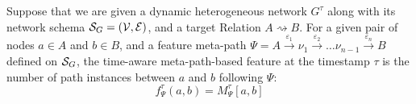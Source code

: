 \begin{definition}
	Suppose that we are given a dynamic heterogeneous network $G^{\tau}$ along with its network schema $\mathcal{S}_G=(\mathcal{V}, \mathcal{E})$, and a target Relation $A\rightsquigarrow B$. {\color{red}For a given pair of nodes $a\in A$ and $b\in B$, and a feature meta-path $\Psi=A\xrightarrow{\varepsilon_1}\nu_1\xrightarrow{\varepsilon_2}\dots\nu_{n-1}\xrightarrow{\varepsilon_{n}}B$ defined on $\mathcal{S}_G$, the time-aware meta-path-based feature at the timestamp $\tau$ is the number of path instances between $a$ and $b$ following $\Psi$:
	\begin{equation*}
		f_{\Psi}^\tau(a,b)=M^\tau_{\Psi}[a,b]
	\end{equation*}}
\end{definition}

